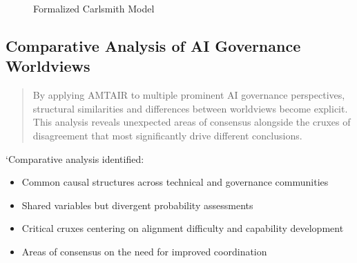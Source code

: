 \documentclass[]{book}
\providecommand{\tightlist}{%
  \setlength{\itemsep}{0pt}\setlength{\parskip}{0pt}}
\begin{document}
\begin{figure}


\caption{\label{fig-carlsmith-model}Formalized Carlsmith Model}

\end{figure}%

\subsection{Comparative Analysis of AI Governance
Worldviews}\label{sec-comparative-analysis}

\begin{quote}
By applying AMTAIR to multiple prominent AI governance perspectives,
structural similarities and differences between worldviews become
explicit. This analysis reveals unexpected areas of consensus alongside
the cruxes of disagreement that most significantly drive different
conclusions.
\end{quote}

`Comparative analysis identified:

\begin{itemize}
\tightlist
\item
  Common causal structures across technical and governance communities
\item
  Shared variables but divergent probability assessments
\item
  Critical cruxes centering on alignment difficulty and capability
  development
\item
  Areas of consensus on the need for improved coordination
\end{itemize}
\end{document}
